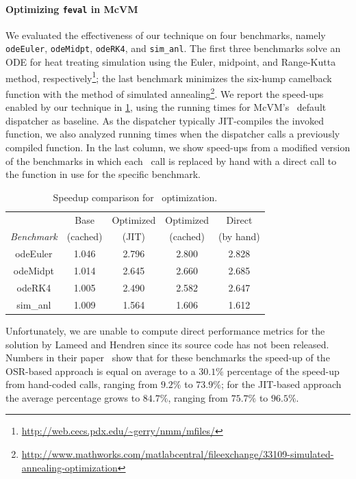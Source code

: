 \paragraph{Optimizing {\tt feval} in McVM}
We evaluated the effectiveness of our technique on four benchmarks, namely {\tt odeEuler}, {\tt odeMidpt}, {\tt odeRK4}, and {\tt sim\_anl}. The first three benchmarks solve an ODE for heat treating simulation using the Euler, midpoint, and Range-Kutta method, respectively\footnote{\url{http://web.cecs.pdx.edu/~gerry/nmm/mfiles/}}; the last benchmark minimizes the six-hump camelback function with the method of simulated annealing\footnote{\url{http://www.mathworks.com/matlabcentral/fileexchange/33109-simulated-annealing-optimization}}. We report the speed-ups enabled by our technique in \mytable\ref{tab:feval}, using the running times for McVM's \feval\ default dispatcher as baseline. As the dispatcher typically JIT-compiles the invoked function, we also analyzed running times when the dispatcher calls a previously compiled function. In the last column, we show speed-ups from a modified version of the benchmarks in which each \feval\ call is replaced by hand with a direct call to the function in use for the specific benchmark.
  
\begin{table}
\begin{small}
    \begin{tabular}{ |c|c|c|c|c| }
        \cline{2-5}
        \multicolumn{1}{c|}{} & Base & Optimized & Optimized & Direct \\ 
        \cline{1-1}
        {\em Benchmark} & (cached) & (JIT) & (cached) & (by hand) \\
        \hline
        \hline
        odeEuler & 1.046 & 2.796 & 2.800 & 2.828 \\ 
        \hline
        odeMidpt & 1.014 & 2.645 & 2.660 & 2.685 \\ 
        \hline
        odeRK4 & 1.005 & 2.490 & 2.582 & 2.647 \\ 
        \hline
        sim\_anl & 1.009 & 1.564 & 1.606 & 1.612 \\ 
        \hline
    \end{tabular} 
    \caption{\label{tab:feval} Speedup comparison for \feval\ optimization.} 
\end{small}
\end{table}  
  
Unfortunately, we are unable to compute direct performance metrics for the solution by Lameed and Hendren since its source code has not been released. Numbers in their paper~\cite{lameed2013feval} show that for these benchmarks the speed-up of the OSR-based approach is equal on average to a $30.1\%$ percentage of the speed-up from hand-coded calls, ranging from $9.2\%$ to $73.9\%$; for the JIT-based approach the average percentage grows to $84.7\%$, ranging from $75.7\%$ to $96.5\%$.

